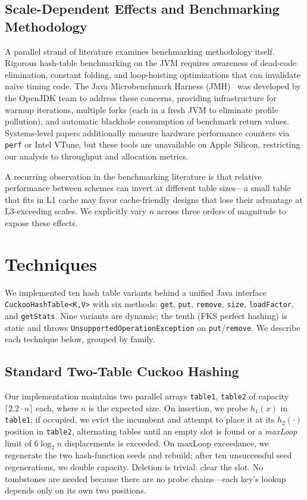 \documentclass[10pt,journal,compsoc]{IEEEtran}
\begin{document}
\subsection{Scale-Dependent Effects and Benchmarking Methodology}
A parallel strand of literature examines benchmarking methodology itself. Rigorous hash-table benchmarking on the JVM requires awareness of dead-code elimination, constant folding, and loop-hoisting optimizations that can invalidate naive timing code. The Java Microbenchmark Harness (JMH)~\cite{jmh} was developed by the OpenJDK team to address these concerns, providing infrastructure for warmup iterations, multiple forks (each in a fresh JVM to eliminate profile pollution), and automatic blackhole consumption of benchmark return values. Systems-level papers additionally measure hardware performance counters via \texttt{perf} or Intel VTune, but these tools are unavailable on Apple Silicon, restricting our analysis to throughput and allocation metrics.

A recurring observation in the benchmarking literature is that relative performance between schemes can invert at different table sizes---a small table that fits in L1 cache may favor cache-friendly designs that lose their advantage at L3-exceeding scales. We explicitly vary $n$ across three orders of magnitude to expose these effects.

\section{Techniques}\label{sec:techniques}

We implemented ten hash table variants behind a unified Java interface \texttt{CuckooHashTable<K,V>} with six methods: \texttt{get}, \texttt{put}, \texttt{remove}, \texttt{size}, \texttt{loadFactor}, and \texttt{getStats}. Nine variants are dynamic; the tenth (FKS perfect hashing) is static and throws \texttt{UnsupportedOperationException} on \texttt{put}/\texttt{remove}. We describe each technique below, grouped by family.

\subsection{Standard Two-Table Cuckoo Hashing}
Our implementation maintains two parallel arrays \texttt{table1}, \texttt{table2} of capacity $\lceil 2.2 \cdot n \rceil$ each, where $n$ is the expected size. On insertion, we probe $h_1(x)$ in \texttt{table1}; if occupied, we evict the incumbent and attempt to place it at its $h_2(\cdot)$ position in \texttt{table2}, alternating tables until an empty slot is found or a \emph{maxLoop} limit of $6\log_2 n$ displacements is exceeded. On maxLoop exceedance, we regenerate the two hash-function seeds and rebuild; after ten unsuccessful seed regenerations, we double capacity. Deletion is trivial: clear the slot. No tombstones are needed because there are no probe chains---each key's lookup depends only on its own two positions.
\end{document}
